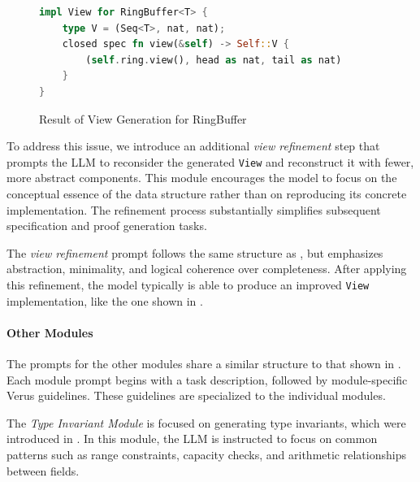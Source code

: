 \begin{figure}
\begin{lstlisting}[language=Rust,style=boxed,showstringspaces=false,basicstyle=\small\ttfamily]
impl View for RingBuffer<T> {
    type V = (Seq<T>, nat, nat);
    closed spec fn view(&self) -> Self::V {
        (self.ring.view(), head as nat, tail as nat) 
    }
}
\end{lstlisting}
\caption{Result of View Generation for RingBuffer}
\label{fig:rb-viewgen}
\end{figure}

To address this issue, we introduce an additional \emph{view refinement} step that prompts the LLM to reconsider the generated \texttt{View} and reconstruct it with fewer, more abstract components. This module encourages the model to focus on the conceptual essence of the data structure rather than on reproducing its concrete implementation. The refinement process substantially simplifies subsequent specification and proof generation tasks.

The \emph{view refinement} prompt follows the same structure as , but emphasizes abstraction, minimality, and logical coherence over completeness. After applying this refinement, the model typically is able to produce an improved \texttt{View} implementation, like the one shown in .%


\paragraph{Other Modules}
The prompts for the other modules share a similar structure to that shown in . Each module prompt begins with a task description, followed by module-specific Verus guidelines.  These guidelines are specialized to the individual modules.

The \textit{Type Invariant Module} is focused on generating type invariants, which were introduced in .  In this module, the LLM is instructed to focus on common patterns such as range constraints, capacity checks, and arithmetic relationships between fields.%

